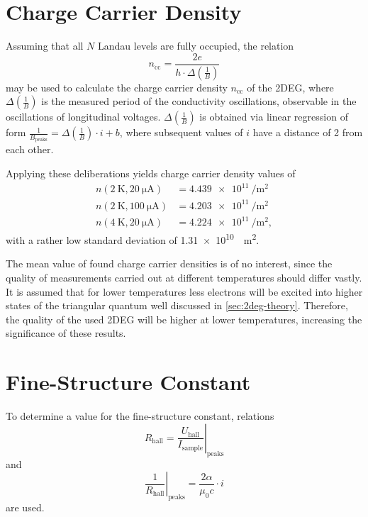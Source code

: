 \section{Charge Carrier Density} %
Assuming that all $N$ Landau levels are fully occupied, the relation
\begin{equation*}
	n_\text{cc} = \frac{2e}{h\cdot\Delta\left(\frac{1}{B}\right)}
\end{equation*}
may be used to calculate the charge carrier density $n_\text{cc}$ of the 2DEG, where $\Delta\left(\frac{1}{B}\right)$ is the measured period of the conductivity oscillations, observable in the oscillations of longitudinal voltages.
$\Delta\left(\frac{1}{B}\right)$ is obtained via linear regression of form $\frac{1}{B_\text{peaks}} = \Delta\left(\frac{1}{B}\right)\cdot i + b$, where subsequent values of $i$ have a distance of 2 from each other.

Applying these deliberations yields charge carrier density values of
\begin{align*}
	n\left(\SI{2}{\kelvin},\SI{20}{\micro\ampere}\right) &= \SI{4.439e11}{\per\meter\squared} \\
	n\left(\SI{2}{\kelvin},\SI{100}{\micro\ampere}\right) &= \SI{4.203e11}{\per\meter\squared} \\
	n\left(\SI{4}{\kelvin},\SI{20}{\micro\ampere}\right) &= \SI{4.224e11}{\per\meter\squared},
\end{align*}
with a rather low standard deviation of \SI{1.31e10}{\per\meter\squared}. %

The mean value of found charge carrier densities is of no interest, since the quality of measurements carried out at different temperatures should differ vastly.
It is assumed that for lower temperatures less electrons will be excited into higher states of the triangular quantum well discussed in \autoref{sec:2deg-theory}.
Therefore, the quality of the used 2DEG will be higher at lower temperatures, increasing the significance of these results.

\section{Fine-Structure Constant} %
To determine a value for the fine-structure constant, relations
\begin{equation*}
	R_\text{hall} = \left. \frac{U_\text{hall}}{I_\text{sample}}\right\rvert_\text{peaks}
\end{equation*}
and
\begin{equation*}
	\left. \frac{1}{R_\text{hall}}\right\rvert_\text{peaks} = \frac{2\alpha}{\mu_0 c}\cdot i
\end{equation*}
are used.

